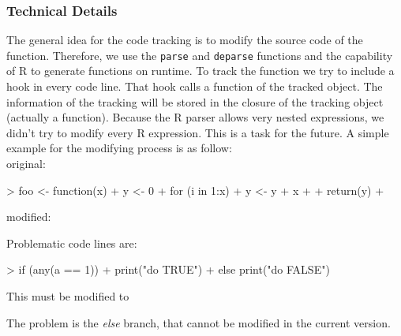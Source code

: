 \documentclass[12pt, a4paper]{article}
\begin{document}
\subsubsection{Technical Details}
The general idea for the code tracking is to modify the source code of the function.
Therefore, we use the {\tt parse} and {\tt deparse} functions and the capability of R to generate functions on runtime.
To track the function we try to include a hook in every code line.
That hook calls a function of the tracked object.
The information of the tracking will be stored in the closure of the tracking object (actually a function).
Because the R parser allows very nested expressions, we didn't try to modify every R expression.
This is a task for the future.
A simple example for the modifying process is as follow:\\
original:
\begin{Schunk}
\begin{Sinput}
> foo <- function(x) {
+     y <- 0
+     for (i in 1:x) {
+         y <- y + x
+     }
+     return(y)
+ }
\end{Sinput}
\end{Schunk}
modified:
\begin{Schunk}
\end{Schunk}

Problematic code lines are:

\begin{Schunk}
\begin{Sinput}
> if (any(a == 1)) {
+     print("do TRUE")
+ } else print("do FALSE")
\end{Sinput}
\end{Schunk}
This must be modified to
\begin{Schunk}
\end{Schunk}
The problem is the \textit{else} branch, that cannot be modified in the current version.
\end{document}
